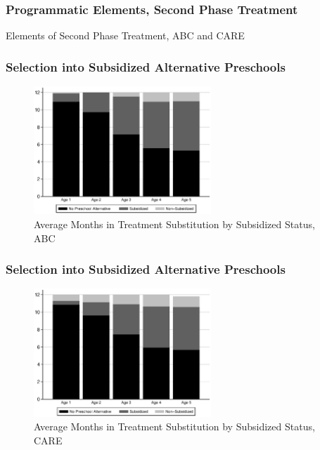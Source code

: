 \documentclass[static]{JJH-Beamer}
\begin{document}
\begin{frame}
\frametitle{Programmatic Elements, Second Phase Treatment}
	\begin{table}
		\caption{Elements of Second Phase Treatment, ABC and CARE}
	\scalebox{0.6}{}
	\end{table}
\hyperlink{programs}{}
\end{frame}


\begin{frame}
\frametitle{Selection into Subsidized Alternative Preschools}\label{abc_subsidized}
\begin{figure}
\caption{Average Months in Treatment Substitution by Subsidized Status, ABC}
	\includegraphics[width=18em]{output/blackwhite_CCnumber}
\end{figure}
\hyperlink{t_abc_substitution}{}
\end{frame}


\begin{frame}
\frametitle{Selection into Subsidized Alternative Preschools}\label{care_subsidized}
\begin{figure}
\caption{Average Months in Treatment Substitution by Subsidized Status, CARE}
	\includegraphics[width=18em]{output/blackwhite_CCnumber_care}
\end{figure}
\hyperlink{t_care_substitution}{}
\end{frame}
\end{document}
